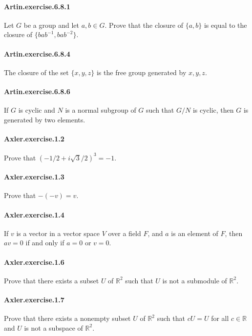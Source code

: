 \documentclass{article}
\begin{document}
\paragraph{Artin.exercise.6.8.1} Let $G$ be a group and let $a, b \in G$. Prove that the closure of $\{a, b\}$ is equal to the closure of $\{bab^{-1}, bab^{-2}\}$.

\paragraph{Artin.exercise.6.8.4} The closure of the set $\{x,y,z\}$ is the free group generated by $x,y,z$.

\paragraph{Artin.exercise.6.8.6} If $G$ is cyclic and $N$ is a normal subgroup of $G$ such that $G/N$ is cyclic, then $G$ is generated by two elements.

\paragraph{Axler.exercise.1.2} Prove that $(-1/2 + i\sqrt{3}/2)^3 = -1$.

\paragraph{Axler.exercise.1.3} Prove that $-\left(-v\right) = v$.

\paragraph{Axler.exercise.1.4} If $v$ is a vector in a vector space $V$ over a field $F$, and $a$ is an element of $F$, then $av=0$ if and only if $a=0$ or $v=0$.

\paragraph{Axler.exercise.1.6} Prove that there exists a subset $U$ of $\mathbb{R}^2$ such that $U$ is not a submodule of $\mathbb{R}^2$.

\paragraph{Axler.exercise.1.7} Prove that there exists a nonempty subset $U$ of $\mathbb{R}^2$ such that $cU=U$ for all $c\in\mathbb{R}$ and $U$ is not a subspace of $\mathbb{R}^2$.
\end{document}
